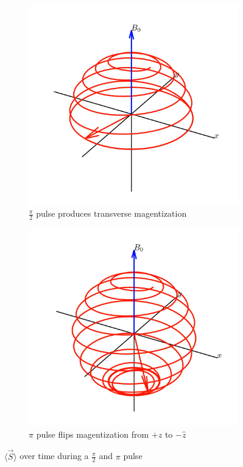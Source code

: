\documentclass[%
 reprint,
 amsmath,amssymb,
 aps,
]{revtex4-2}
\newcommand{\halfpi}{\frac{\pi}{2}}
\begin{document}
\begin{figure}[htbp]
    \centering
    \begin{subfigure}{0.3\linewidth}
        \includegraphics[width = \linewidth]{figs/pi-2-pulse.png}
        \caption{$\halfpi$ pulse produces transverse magentization}
    \end{subfigure}
    \begin{subfigure}{0.3\linewidth}
        \includegraphics[width = \linewidth]{figs/pi-pulse.png}
        \caption{$\pi$ pulse flips magentization from $+\hat{z}$ to $-\hat{z}$}
    \end{subfigure}
    \caption{$\langle \vec{S} \rangle$ over time during a $\halfpi$ and $\pi$ pulse}\label{fig:pulse-spirals}
\end{figure}
\end{document}
